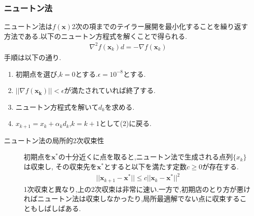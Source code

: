\documentclass[12pt]{jarticle}
\begin{document}
\subsubsection{ニュートン法}
ニュートン法は$f(\boldsymbol{x})$2次の項までのテイラー展開を最小化することを繰り返す方法である.以下のニュートン方程式を解くことで得られる.
\begin{eqnarray}
    \nabla^2f(\boldsymbol{x}_k)d=-\nabla f(\boldsymbol{x}_k)\nonumber
\end{eqnarray}
手順は以下の通り.
\begin{enumerate}
    \item 初期点を選び,$k=0$とする.$\epsilon=10^{-8}$とする.
    \item $||\nabla f(\boldsymbol{x_k})||<\epsilon$が満たされていれば終了する.
    \item ニュートン方程式を解いて$d_k$を求める.
    \item $x_{k+1}=x_k+\alpha_kd_k$,$k=k+1$として(2)に戻る.
\end{enumerate}
\begin{description}
    \item[ニュートン法の局所的2次収束性] 初期点を$\boldsymbol{x}^*$の十分近くに点を取ると,ニュートン法で生成される点列$\{x_k\}$は収束し,
    その収束先を$\boldsymbol{x}^*$とすると以下を満たす定数$c\geq 0$が存在する.  
    \begin{eqnarray}
        ||\boldsymbol{x}_{k+1}-\boldsymbol{x}^*||\leq c||\boldsymbol{x}_{k}-\boldsymbol{x}^*||^2\nonumber
    \end{eqnarray}
    1次収束と異なり,上の2次収束は非常に速い.一方で,初期店のとり方が悪ければニュートン法は収束しなかったり,局所最適解でない点に収束することもしばしばある.
\end{description}
\end{document}
